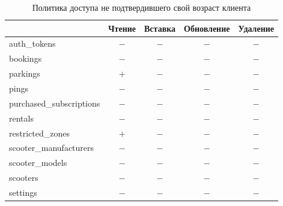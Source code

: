 \begin{table}[H]
	\begin{threeparttable}[b]
		\caption{Политика доступа не подтвердившего свой возраст клиента}
		\label{tbl:pending-client-policy}
		{\renewcommand{\arraystretch}{1.2}
			\begin{tabularx}{\textwidth}
				{
					| >{\raggedright\arraybackslash}X
					| >{\centering\arraybackslash}c
					| >{\centering\arraybackslash}c
					| >{\centering\arraybackslash}c
					| >{\centering\arraybackslash}c |
				}
				\hline
				                         & \textbf{Чтение}            & \textbf{Вставка} & \textbf{Обновление}        & \textbf{Удаление} \\
				\hline
				auth\_tokens             & $-$                        & $-$              & $-$                        & $-$               \\
				\hline
				bookings                 & $-$                        & $-$              & $-$                        & $-$               \\
				\hline
				parkings                 & $+$                        & $-$              & $-$                        & $-$               \\
				\hline
				pings                    & $-$                        & $-$              & $-$                        & $-$               \\
				\hline
				purchased\_subscriptions & $-$                        & $-$              & $-$                        & $-$               \\
				\hline
				rentals                  & $-$                        & $-$              & $-$                        & $-$               \\
				\hline
				restricted\_zones        & $+$                        & $-$              & $-$                        & $-$               \\
				\hline
				scooter\_manufacturers   & $-$                        & $-$              & $-$                        & $-$               \\
				\hline
				scooter\_models          & $-$                        & $-$              & $-$                        & $-$               \\
				\hline
				scooters                 & $-$                        & $-$              & $-$                        & $-$               \\
				\hline
				settings                 & $-$                        & $-$              & $-$                        & $-$               \\

\end{tabularx}}
\end{threeparttable}
\end{table}
